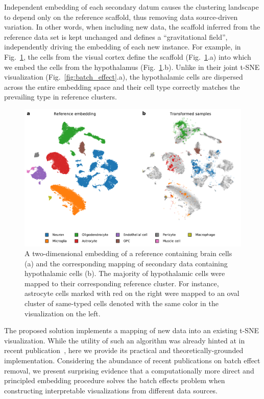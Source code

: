 \documentclass[runningheads]{llncs}
\begin{document}
Independent embedding of each secondary datum causes the clustering landscape
to depend only on the reference scaffold, thus removing data source-driven
variation. In other words, when including new data, the scaffold inferred from
the reference data set is kept unchanged and defines a ``gravitational field'',
independently driving the embedding of each new instance. For example, in
Fig.~\ref{fig:transform_brain}, the cells from the visual cortex define the
scaffold (Fig.~\ref{fig:transform_brain}.a) into which we embed the cells from
the hypothalamus (Fig.~\ref{fig:transform_brain}.b). Unlike in their joint
t\nobreakdash -SNE visualization (Fig.~\ref{fig:batch_effect}.a), the
hypothalamic cells are dispersed across the entire embedding space and their
cell type correctly matches the prevailing type in reference clusters.

\begin{figure}[htb]
  \includegraphics[width=\textwidth]{figures/transform_brain.pdf}
  \caption{A two-dimensional embedding of a reference containing brain cells
  (a) and the corresponding mapping of secondary data containing hypothalamic
  cells (b).  The majority of hypothalamic cells were mapped to their
  corresponding reference cluster. For instance, astrocyte cells marked with
  red on the right were mapped to an oval cluster of same-typed cells denoted
  with the same color in the visualization on the left.}
  \label{fig:transform_brain}
\end{figure}

The proposed solution implements a mapping of new data into an existing
t-SNE visualization. While the utility of such an algorithm was already hinted
at in recent publication~\cite{art_of_using_tsne}, here we provide its
practical and theoretically-grounded implementation. Considering the abundance
of recent publications on batch effect removal, we present surprising evidence
that a computationally more direct and principled embedding procedure solves
the batch effects problem when constructing interpretable visualizations from
different data sources.
\end{document}
